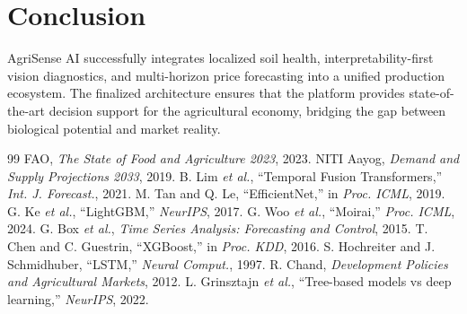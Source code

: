 \documentclass[conference]{IEEEtran}
\begin{document}
\section{Conclusion}
AgriSense AI successfully integrates localized soil health, interpretability-first vision diagnostics, and multi-horizon price forecasting into a unified production ecosystem. The finalized architecture ensures that the platform provides state-of-the-art decision support for the agricultural economy, bridging the gap between biological potential and market reality.

\begin{thebibliography}{99}
 FAO, \emph{The State of Food and Agriculture 2023}, 2023.
 NITI Aayog, \emph{Demand and Supply Projections 2033}, 2019.
 B. Lim \emph{et al.}, ``Temporal Fusion Transformers,'' \emph{Int. J. Forecast.}, 2021.
 M. Tan and Q. Le, ``EfficientNet,'' in \emph{Proc. ICML}, 2019.
 G. Ke \emph{et al.}, ``LightGBM,'' \emph{NeurIPS}, 2017.
 G. Woo \emph{et al.}, ``Moirai,'' \emph{Proc. ICML}, 2024.
 G. Box \emph{et al.}, \emph{Time Series Analysis: Forecasting and Control}, 2015.
 T. Chen and C. Guestrin, ``XGBoost,'' in \emph{Proc. KDD}, 2016.
 S. Hochreiter and J. Schmidhuber, ``LSTM,'' \emph{Neural Comput.}, 1997.
 R. Chand, \emph{Development Policies and Agricultural Markets}, 2012.
 L. Grinsztajn \emph{et al.}, ``Tree-based models vs deep learning,'' \emph{NeurIPS}, 2022.
\end{thebibliography}
\end{document}
